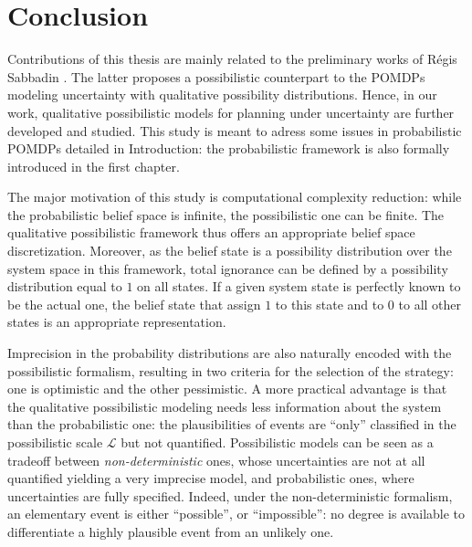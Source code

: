 \chapter*{Conclusion}
Contributions of this thesis are
mainly related to the preliminary works 
of R\'egis Sabbadin \cite{Sabbadin:1999:pipomdp}.
The latter proposes 
a possibilistic counterpart 
to the POMDPs 
modeling uncertainty 
with qualitative possibility distributions.
Hence, in our work, 
qualitative possibilistic models 
for planning under uncertainty
are further developed and studied. 
This study is meant to adress some issues 
in probabilistic POMDPs 
detailed in Introduction: 
the probabilistic framework is also 
formally introduced 
in the first chapter.

The major motivation of this study 
is computational complexity reduction: 
while the probabilistic belief space is infinite,
the possibilistic one can be finite.
The qualitative possibilistic framework 
thus offers an appropriate 
belief space discretization.
Moreover, as the belief state 
is a possibility distribution 
over the system space in this framework, 
total ignorance can be defined 
by a possibility distribution 
equal to $1$ on all states.
If a given system state is perfectly known
to be the actual one, 
the belief state that assign $1$ to this state 
and to $0$ to all other states 
is an appropriate representation.

Imprecision in the probability distributions
are also naturally encoded 
with the possibilistic formalism, 
resulting in two criteria
for the selection of the strategy:
one is optimistic 
and the other pessimistic.
A more practical advantage is that 
the qualitative possibilistic modeling 
needs less information about the system
than the probabilistic one:
the plausibilities of events 
are ``only'' classified 
in the possibilistic scale $\mathcal{L}$ 
but not quantified.
Possibilistic models can be seen 
as a tradeoff between \textit{non-deterministic} ones, 
whose uncertainties are not at all quantified 
yielding a very imprecise model, 
and probabilistic ones, 
where uncertainties are fully specified.
Indeed, under the non-deterministic formalism,
an elementary event is either ``possible'',
or ``impossible'':
no degree is available
to differentiate a highly plausible event 
from an unlikely one.

